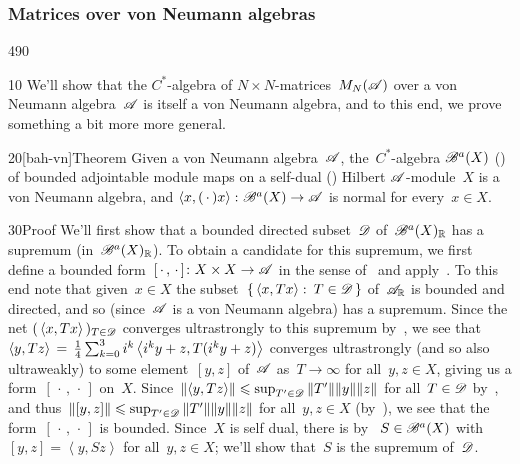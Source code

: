 \subsubsection{Matrices over von Neumann algebras} 
\begin{parsec}{490}%
\begin{point}{10}%
We'll show that the $C^*$-algebra
of $N\times N$-matrices~$M_N(\mathscr{A})$
over a von Neumann algebra~$\mathscr{A}$
is itself a von Neumann algebra,
and to this end,
we prove something a bit more more general.
\end{point}
\begin{point}{20}[bah-vn]{Theorem}%
Given a von Neumann algebra~$\mathscr{A}$,
the~$C^*$-algebra $\mathscr{B}^a(X)$ ()%
of bounded adjointable module maps on
a self-dual () Hilbert $\mathscr{A}$-module~$X$
is a  von Neumann algebra,
and
$\left<x,(\,\cdot\,)x\right>\colon \mathscr{B}^a(X)\to\mathscr{A}$
is normal for every~$x\in X$.%
\begin{point}{30}{Proof}%
We'll first show that
a  bounded directed subset~$\mathscr{D}$ of~$\mathscr{B}^a(X)_{\mathbb{R}}$
has a supremum (in~$\mathscr{B}^a(X)_{\mathbb{R}}$).
To obtain a candidate for this supremum,
we first define
a bounded form~$[\,\cdot\,,\,\cdot\,]\colon X\times X\to\mathscr{A}$
in the sense of~
and apply~.
To this end note that given~$x\in X$
the subset~$\{\,\left<x,Tx\right>\colon \, T\in\mathscr{D}\,\}$
of~$\mathscr{A}_{\mathbb{R}}$
is bounded and directed,
and so 
(since~$\mathscr{A}$ is a von Neumann algebra)
has a supremum.
Since the 
net $(\,\left<x,Tx\right>\,)_{T\in \mathscr{D}}$
converges ultrastrongly to this supremum
by~,
we see that
$\left<y,Tz\right>\,= \,\frac{1}{4}
\sum_{k=0}^3
i^k\left<i^ky+z,\smash{T(i^ky+z)}\right>$
converges ultrastrongly (and so also ultraweakly) to
some element~$[y,z]$ of~$\mathscr{A}$
as~$T\to\infty$ for all~$y,z\in X$,
giving us a form~$[\,\cdot\,,\,\cdot\,]$ on~$X$.
Since~$\left\|\left<y,T z \right>\right\|
\leqslant \sup_{T'\in \mathscr{D}} \|T'\| \|y\|\|z\|$
for all~$T\in\mathscr{D}$
by~,
and thus~$\|[y,z]\|\leqslant \sup_{T'\in\mathscr{D}} \|T'\|\|y\|\|z\|$
for all~$y,z\in X$
(by~),
we see that the form~$[\,\cdot\,,\,\cdot\,]$
is bounded.
Since~$X$ is self dual,
there is
by~
$S\in \mathscr{B}^a(X)$
with
$[y,z]=\left<y,Sz\right>$
for all~$y,z\in X$;
we'll show that~$S$ is the supremum of~$\mathscr{D}$.


\end{point}
\end{point}
\end{parsec}
